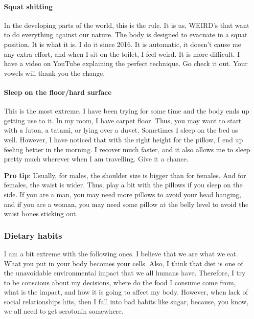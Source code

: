\documentclass{article}
\begin{document}
\paragraph{Squat shitting}
In the developing parts of the world, this is the rule. It is us, WEIRD’s that want to do everything against our nature. The body is designed to evacuate in a squat position. It is what it is. I do it since 2016. It is automatic, it doesn't cause me any extra effort, and when I sit on the toilet, I feel weird. It is more difficult. I have a video on YouTube explaining the perfect technique. Go check it out. Your vowels will thank you the change. 
\paragraph{Sleep on the floor/hard surface}
This is the most extreme. I have been trying for some time and the body ends up getting use to it. In my room, I have carpet floor. Thus, you may want to start with a futon, a tatami, or lying over a duvet. Sometimes I sleep on the bed as well. However, I have noticed that with the right height for the pillow, I end up feeling better in the morning. I recover much faster, and it also allows me to sleep pretty much wherever when I am travelling. Give it a chance.

\textbf{Pro tip}: Usually, for males, the shoulder size is bigger than for females. And for females, the waist is wider. Thus, play a bit with the pillows if you sleep on the side. If you are a man, you may need more pillows to avoid your head hanging, and if you are a woman, you may need some pillow at the belly level to avoid the waist bones sticking out.

\subsubsection{Dietary habits}
\label{subsubsec: Dietary}
I am a bit extreme with the following ones. I believe that we are what we eat. What you put in your body becomes your cells. Also, I think that diet is one of the unavoidable environmental impact that we all humans have. Therefore, I try to be conscious about my decisions, where do the food I consume come from, what is the impact, and how it is going to affect my body. However, when lack of social relationships hits, then I fall into bad habits like sugar, because, you know, we all need to get serotonin somewhere.
\end{document}

